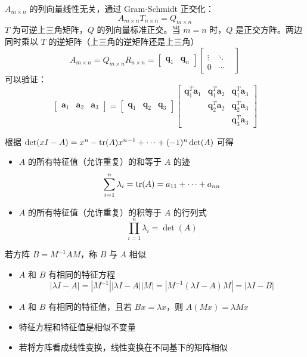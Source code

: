 \begin{remark}
    $A_{m\times n}$ 的列向量线性无关，通过 Gram-Schmidt 正交化：
    \[A_{m\times n}T_{n\times n} = Q_{m\times n}\]
    $T$ 为可逆上三角矩阵，$Q$ 的列向量标准正交。当 $m=n$ 时，$Q$ 是正交方阵。两边同时乘以 $T$ 的逆矩阵（上三角的逆矩阵还是上三角）
    \[A_{m \times n}=Q_{m \times n} R_{n \times n}=\begin{bmatrix}
        \boldsymbol{q}_{1} & \boldsymbol{q}_{n}
    \end{bmatrix}\begin{bmatrix}  
        &  &  \\  
      \vdots  & \ddots &  \\  
      0  & \cdots &   
    \end{bmatrix} \]
    可以验证：
    \[\begin{bmatrix}
        \boldsymbol{a}_1 & \boldsymbol{a}_2 & \boldsymbol{a}_3
    \end{bmatrix} = \begin{bmatrix}
        \boldsymbol{q}_1 & \boldsymbol{q}_2 & \boldsymbol{q}_3
    \end{bmatrix}\begin{bmatrix}
        \boldsymbol{q}_{1}^{T} \boldsymbol{a}_{1} & \boldsymbol{q}_{1}^{T} \boldsymbol{a}_{2} & \boldsymbol{q}_{1}^{T} \boldsymbol{a}_{3} \\
        & \boldsymbol{q}_{2}^{T} \boldsymbol{a}_{2} & \boldsymbol{q}_{2}^{T} \boldsymbol{a}_{3} \\
        & & \boldsymbol{q}_{3}^{T} \boldsymbol{a}_{3}
    \end{bmatrix}\]
\end{remark}

\begin{remark}
    根据 $\det(xI-A) = x^n - \operatorname{tr}(A)x^{n - 1} + \cdots + (-1)^n\det(A)$ 可得
    \begin{itemize}
        \item $A$ 的所有特征值（允许重复）的和等于 $A$ 的迹 \[\sum_{i = 1}^n \lambda_i = \operatorname{tr}(A) = a_{11} + \cdots + a_{nn}\]
        \item $A$ 的所有特征值（允许重复）的积等于 $A$ 的行列式 \[\prod_{i = 1}^n\lambda_i = \det(A)\]
    \end{itemize}
\end{remark}

\begin{remark}
    若方阵 $B = M^{-1}AM$，称 $B$ 与 $A$ 相似
    \begin{itemize}
        \item $A$ 和 $B$ 有相同的特征方程 \[|\lambda I - A| = |M^{-1}||\lambda I-A||M| = |M^{-1}(\lambda I - A)M| = |\lambda I - B|\]
        \item $A$ 和 $B$ 有相同的特征值，且若 $Bx = \lambda x$，则 $A(Mx) = \lambda Mx$
        \item 特征方程和特征值是相似不变量
        \item 若将方阵看成线性变换，线性变换在不同基下的矩阵相似
    \end{itemize}
\end{remark}

